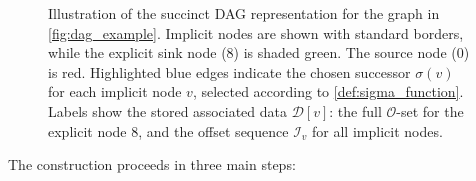 \begin{figure}[htbp]
    \caption{Illustration of the succinct DAG representation for the graph in \autoref{fig:dag_example}. Implicit nodes are shown with standard borders, while the explicit sink node (8) is shaded green. The source node (0) is red. Highlighted blue edges indicate the chosen successor $\sigma(v)$ for each implicit node $v$, selected according to \ref{def:sigma_function}. Labels show the stored associated data $\mathcal{D}[v]$: the full $\mathcal{O}$-set for the explicit node 8, and the offset sequence $\mathcal{I}_v$ for all implicit nodes.}
    \label{fig:succinct_dag_example}
\end{figure}

The construction proceeds in three main steps:

